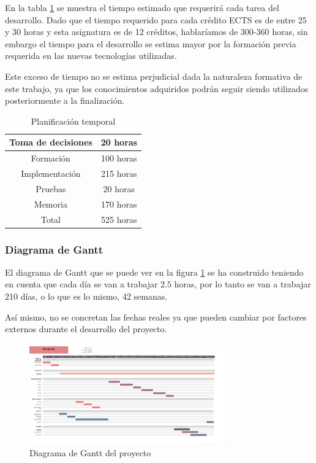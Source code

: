 En la tabla \ref{tab:planificacionTemporal} se muestra el tiempo estimado que requerirá cada tarea del desarrollo. Dado que el tiempo requerido para cada crédito ECTS es de entre 25 y 30 horas y esta asignatura es de 12 créditos, hablaríamos de 300-360 horas, sin embargo el tiempo para el desarrollo se estima mayor por la formación previa requerida en las nuevas tecnologías utilizadas. 

Este exceso de tiempo no se estima perjudicial dada la naturaleza formativa de este trabajo, ya que los conocimientos adquiridos podrán seguir siendo utilizados posteriormente a la finalización.

\begin{table}[]
    \centering
    \begin{tabular}{|c|c|}
        \hline
        Toma de decisiones & 20 horas \\
        \hline
        Formación   & 100 horas \\
        \hline
        Implementación & 215 horas \\
        \hline
        Pruebas & 20 horas \\
        \hline
        Memoria & 170 horas \\
        \hline
        \hline
        Total & 525 horas \\
        \hline
    \end{tabular}
    \caption{Planificación temporal}
    \label{tab:planificacionTemporal}
\end{table}


\subsubsection{Diagrama de Gantt}

El diagrama de Gantt que se puede ver en la figura \ref{fig:gantt} se ha construido teniendo en cuenta que cada día se van a trabajar $2.5$ horas, por lo tanto se van a trabajar 210 días, o lo que es lo mismo, 42 semanas.

Así mismo, no se concretan las fechas reales ya que pueden cambiar por factores externos durante el desarrollo del proyecto.

\begin{figure}[h]
\centering
\includegraphics[angle=90,origin=c,width=0.75\textwidth]{imagenes/gantt.png}
\caption{Diagrama de Gantt del proyecto}
\label{fig:gantt}
\end{figure}


